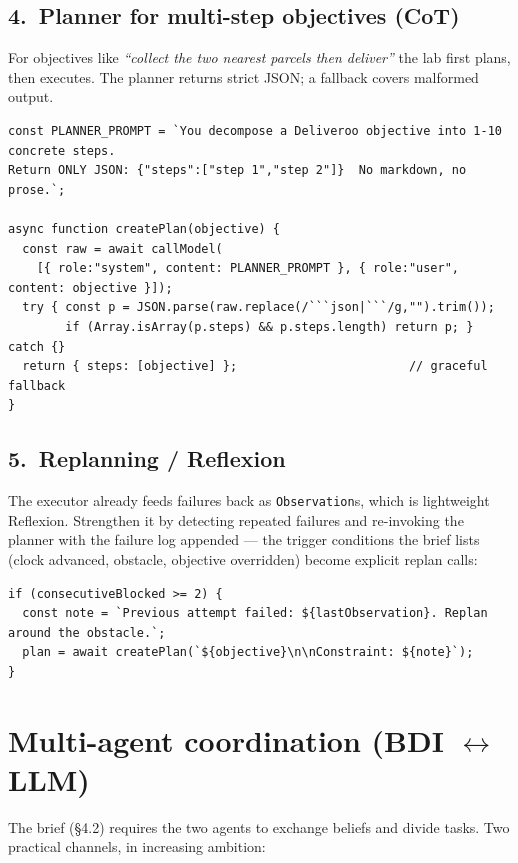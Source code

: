 \documentclass[11pt,a4paper]{article}
\begin{document}
\subsection{4.\ Planner for multi-step objectives (CoT)}
For objectives like \emph{``collect the two nearest parcels then deliver''} the lab first
plans, then executes. The planner returns strict JSON; a fallback covers malformed output.

\begin{lstlisting}
const PLANNER_PROMPT = `You decompose a Deliveroo objective into 1-10 concrete steps.
Return ONLY JSON: {"steps":["step 1","step 2"]}  No markdown, no prose.`;

async function createPlan(objective) {
  const raw = await callModel(
    [{ role:"system", content: PLANNER_PROMPT }, { role:"user", content: objective }]);
  try { const p = JSON.parse(raw.replace(/```json|```/g,"").trim());
        if (Array.isArray(p.steps) && p.steps.length) return p; } catch {}
  return { steps: [objective] };                        // graceful fallback
}
\end{lstlisting}

\subsection{5.\ Replanning / Reflexion}
The executor already feeds failures back as \texttt{Observation}s, which is lightweight
Reflexion. Strengthen it by detecting repeated failures and re-invoking the planner with the
failure log appended --- the trigger conditions the brief lists (clock advanced, obstacle,
objective overridden) become explicit replan calls:

\begin{lstlisting}
if (consecutiveBlocked >= 2) {
  const note = `Previous attempt failed: ${lastObservation}. Replan around the obstacle.`;
  plan = await createPlan(`${objective}\n\nConstraint: ${note}`);
}
\end{lstlisting}

\section{Multi-agent coordination (BDI $\leftrightarrow$ LLM)}
The brief (\S4.2) requires the two agents to exchange beliefs and divide tasks. Two practical
channels, in increasing ambition:
\end{document}
